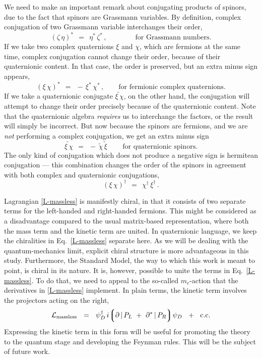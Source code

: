 \documentclass[epsfig,12pt]{article}
\newcommand{\p}{\partial}
\newcommand{\wt}{\widetilde}
\newcommand{\mc}[1]{\mathcal{#1}}
\newcommand{\lgr}{\left\lgroup}
\newcommand{\rgr}{\right\rgroup}
\begin{document}
	We need to make an important remark about conjugating products of spinors,
	due to the fact that spinors are Grassmann variables.
	By definition, complex conjugation of two Grassmann variable interchanges their order,
\begin{equation}
	(\zeta\, \eta)^*	~~=~~	\eta^*\, \zeta^*\,,\qquad\qquad \text{for Grassmann numbers.}
\end{equation}
	If we take two complex quaternions $ \xi $ and $ \chi $, which are fermions at the same time,
	complex conjugation cannot change their order, because of their quaternionic content.
	In that case, the order is preserved, but an extra minus sign appears,
\begin{equation}
\label{ferm-cc}
	(\xi\, \chi)^*		~~=~~	-\, \xi^*\, \chi^*\,,\qquad \text{for fermionic complex quaternions.}
\end{equation}
	If we take a quaternionic conjugate $ \wt{\xi\, \chi} $, on the other hand, 
	the conjugation will attempt to change their order precisely because of the quaternionic content.
	Note that the quaternionic algebra \emph{requires} us to interchange the factors, or
	the result will simply be incorrect.
	But now because the spinors are fermions, and we are \emph{not} performing a
	complex conjugation, we get an extra minus sign
\begin{equation}
\label{ferm-qc}
	\wt{\xi\, \chi}		~~=~~	-\, \wt\chi\, \wt\xi\,\qquad \text{for quaternionic spinors.}
\end{equation}
	The only kind of conjugation which does not produce a negative sign is hermitean
	conjugation --- this combination changes the order of the spinors in agreement with
	both complex and quaternionic conjugations,
\begin{equation}
\label{ferm-hc}
	(\xi\, \chi)^\dag	~~=~~	\chi^\dag\, \xi^\dag\,.
\end{equation}

	Lagrangian \eqref{L-massless} is manifestly chiral, in that it consists of two separate
	terms for the left-handed and right-handed fermions.
	This might be considered as a disadvantage compared to the usual matrix-based representation,
	where both the mass term and the kinetic term are united.
	In quaternionic language, we keep the chiralities in Eq.~\eqref{L-massless} separate here.
	As we will be dealing with the quantum-mechanics limit, explicit chiral structure is more advantageous
	in this study.
	Furthermore, the Standard Model, the way to which this work is meant to point, is chiral in its nature.
	It is, however, possible to unite the terms in Eq.~\eqref{L-massless}.
	To do that, we need to appeal to the so-called $ m_c $-action \cite{thesis} that the derivatives
	in \eqref{L-massless} implement.
	In plain terms, the kinetic term involves the projectors acting on the right,
\begin{equation}
\label{L-united}
	\mc L_\text{massless}	~~=~~	\psi_D^\dag\, i\!\lgr \p \,|\, P_L ~+~ \p^* \,|\, P_R \rgr\! \psi_D  ~~+~~  \text{c.c.}
\end{equation}
	Expressing the kinetic term in this form will be useful for promoting the theory
	to the quantum stage and developing the Feynman rules.
	This will be the subject of future work.
\end{document}
